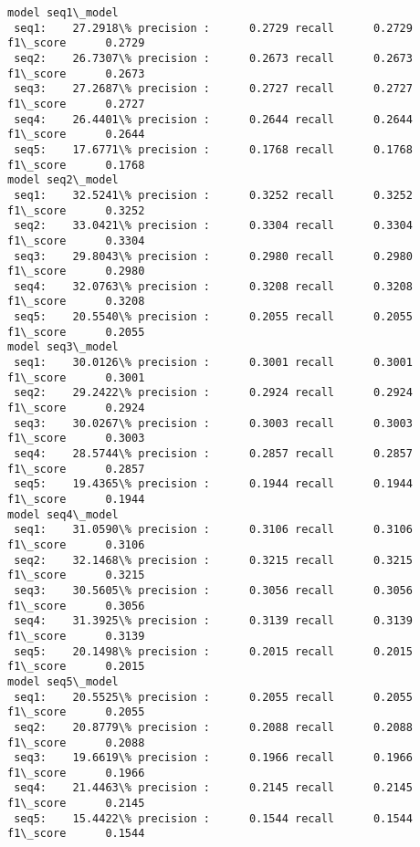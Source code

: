 \documentclass{article}
\begin{document}
    \begin{Verbatim}[commandchars=\\\{\}]
model seq1\_model
 seq1:    27.2918\% precision :      0.2729 recall      0.2729 f1\_score      0.2729
 seq2:    26.7307\% precision :      0.2673 recall      0.2673 f1\_score      0.2673
 seq3:    27.2687\% precision :      0.2727 recall      0.2727 f1\_score      0.2727
 seq4:    26.4401\% precision :      0.2644 recall      0.2644 f1\_score      0.2644
 seq5:    17.6771\% precision :      0.1768 recall      0.1768 f1\_score      0.1768
model seq2\_model
 seq1:    32.5241\% precision :      0.3252 recall      0.3252 f1\_score      0.3252
 seq2:    33.0421\% precision :      0.3304 recall      0.3304 f1\_score      0.3304
 seq3:    29.8043\% precision :      0.2980 recall      0.2980 f1\_score      0.2980
 seq4:    32.0763\% precision :      0.3208 recall      0.3208 f1\_score      0.3208
 seq5:    20.5540\% precision :      0.2055 recall      0.2055 f1\_score      0.2055
model seq3\_model
 seq1:    30.0126\% precision :      0.3001 recall      0.3001 f1\_score      0.3001
 seq2:    29.2422\% precision :      0.2924 recall      0.2924 f1\_score      0.2924
 seq3:    30.0267\% precision :      0.3003 recall      0.3003 f1\_score      0.3003
 seq4:    28.5744\% precision :      0.2857 recall      0.2857 f1\_score      0.2857
 seq5:    19.4365\% precision :      0.1944 recall      0.1944 f1\_score      0.1944
model seq4\_model
 seq1:    31.0590\% precision :      0.3106 recall      0.3106 f1\_score      0.3106
 seq2:    32.1468\% precision :      0.3215 recall      0.3215 f1\_score      0.3215
 seq3:    30.5605\% precision :      0.3056 recall      0.3056 f1\_score      0.3056
 seq4:    31.3925\% precision :      0.3139 recall      0.3139 f1\_score      0.3139
 seq5:    20.1498\% precision :      0.2015 recall      0.2015 f1\_score      0.2015
model seq5\_model
 seq1:    20.5525\% precision :      0.2055 recall      0.2055 f1\_score      0.2055
 seq2:    20.8779\% precision :      0.2088 recall      0.2088 f1\_score      0.2088
 seq3:    19.6619\% precision :      0.1966 recall      0.1966 f1\_score      0.1966
 seq4:    21.4463\% precision :      0.2145 recall      0.2145 f1\_score      0.2145
 seq5:    15.4422\% precision :      0.1544 recall      0.1544 f1\_score      0.1544
    \end{Verbatim}

    \begin{center}
    \end{center}
    { \hspace*{\fill} \\}
    
\end{document}
